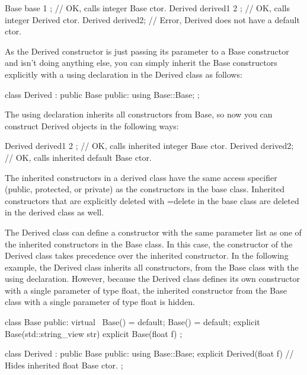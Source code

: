 \begin{cpp}
Base base { 1 }; // OK, calls integer Base ctor.
Derived derived1 { 2 }; // OK, calls integer Derived ctor.
Derived derived2; // Error, Derived does not have a default ctor.
\end{cpp}

As the Derived constructor is just passing its parameter to a Base constructor and isn’t doing anything else, you can simply inherit the Base constructors explicitly with a using declaration in the Derived class as follows:

\begin{cpp}
class Derived : public Base
{
    public:
        using Base::Base;
};
\end{cpp}

The using declaration inherits all constructors from Base, so now you can construct Derived objects in the following ways:

\begin{cpp}
Derived derived1 { 2 }; // OK, calls inherited integer Base ctor.
Derived derived2; // OK, calls inherited default Base ctor.
\end{cpp}

The inherited constructors in a derived class have the same access specifier (public, protected, or private) as the constructors in the base class. Inherited constructors that are explicitly deleted with =delete in the base class are deleted in the derived class as well.


The Derived class can define a constructor with the same parameter list as one of the inherited constructors in the Base class. In this case, the constructor of the Derived class takes precedence over the inherited constructor. In the following example, the Derived class inherits all constructors, from the Base class with the using declaration. However, because the Derived class defines its own constructor with a single parameter of type float, the inherited constructor from the Base class with a single parameter of type float is hidden.

\begin{cpp}
class Base
{
    public:
        virtual ~Base() = default;
        Base() = default;
        explicit Base(std::string_view str) {}
        explicit Base(float f) {}
};

class Derived : public Base
{
    public:
        using Base::Base;
        explicit Derived(float f) {} // Hides inherited float Base ctor.
};
\end{cpp}

